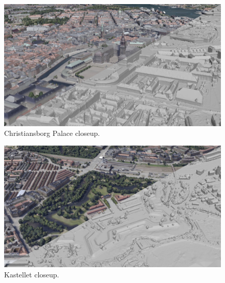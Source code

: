 \documentclass[10pt,letterpaper]{article}
\begin{document}
\begin{figure}
    \centering
    \capstart
    \begin{minipage}[b]{1.0\linewidth}
        \includegraphics[width=\textwidth]{images/copenhagen/results/closeups/diag/christiansborg_palace_diag.jpg}
    \end{minipage}
    \caption{Christiansborg Palace closeup.}
    \label{fig:closeup_christiansborg_palace}
\end{figure}

\begin{figure}
    \centering
    \capstart
    \begin{minipage}[b]{1.0\linewidth}
        \includegraphics[width=\textwidth]{images/copenhagen/results/closeups/diag/kastellet_diag.jpg}
    \end{minipage}
    \caption{Kastellet closeup.}
    \label{fig:closeup_kastellet}
\end{figure}
\end{document}
